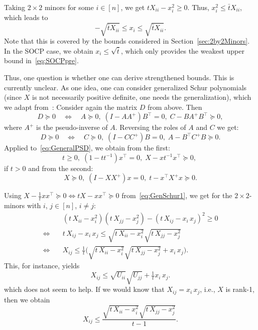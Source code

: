 \documentclass[10pt, a4paper]{article}
\newcommand{\T}{^{\top}}
\begin{document}
Taking $2 \times 2$ minors for some $i \in [n]$, we get
$t X_{ii} - x_i^2 \geq 0$. Thus, $x_i^2 \leq \bar{t} X_{ii}$, which leads
to
\[
  - \sqrt{\bar{t} X_{ii}} \leq x_i \leq \sqrt{\bar{t} X_{ii}}.
\]
Note that this is covered by the bounds considered in
Section~\ref{sec:2by2Minors}. In the SOCP case, we obtain
$x_i \leq \sqrt{\bar{t}}$, which only provides the weakest upper bound
in~\eqref{eq:SOCPpre}.

Thus, one question is whether one can derive strengthened bounds. This is
currently unclear. As one idea, one can consider generalized Schur
polynomials (since $X$ is not necessarily positive definite, one needs the
generalization), which we adapt from~\cite[Section~A.5.5]{BoyV09}: Consider
again the matrix $D$ from above. Then
\[
  D \succeq 0 \quad\Leftrightarrow\quad
  A \succeq 0,\; (I - AA^{+})B\T = 0,\; C - B A^{+} B\T \succeq 0,
\]
where $A^+$ is the pseudo-inverse of $A$. Reversing the roles of $A$ and
$C$ we get:
\[
  D \succeq 0 \quad\Leftrightarrow\quad
  C \succeq 0,\; (I - CC^{+})B = 0,\; A - B\T C^{+} B \succeq 0.
\]
Applied to~\eqref{eq:GeneralPSD}, we obtain from the first:
\begin{equation}\label{eq:GenSchur1}
  t \geq 0,\; (1 - t t^{-1}) x\T = 0,\; X - x t^{-1} x\T \succeq 0,\; 
\end{equation}
if $t > 0$ and from the second:
\begin{equation}\label{eq:GenSchur2}
  X \succeq 0,\; (I - XX^{+})x = 0,\; t - x\T X^{+} x \succeq 0.
\end{equation}

Using
$X - \tfrac{1}{t} x x\T \succeq 0 \Leftrightarrow t X - x x\T \succeq 0$
from~\eqref{eq:GenSchur1}, we get for the $2 \times 2$-minors with $i$,
$j \in [n]$, $i \neq j$:
\begin{align*}
  & (t\, X_{ii} - x_i^2) (t\, X_{jj} - x_j^2) -  (t\, X_{ij} - x_i\, x_j)^2 \geq 0
  \\
  \Leftrightarrow\quad & t \, X_{ij} - x_i\, x_j \leq \sqrt{t\, X_{ii} - x_i^2} \sqrt{t\, X_{jj} - x_j^2}
  \\
  \Leftrightarrow\quad & X_{ij} \leq \frac{1}{t} \bigg(\sqrt{t\, X_{ii} - x_i^2}
                         \sqrt{t\, X_{jj} - x_j^2} + x_i\, x_j\bigg).
\end{align*}
This, for instance, yields
\[
  X_{ij} \leq \sqrt{U_{ii}} \sqrt{U_{jj}} + \tfrac{1}{t} x_i\, x_j.
\]
which does not seem to help. If we would know that $X_{ij} = x_i\, x_j$,
i.e., $X$ is rank-1, then we obtain
\[
  X_{ij} \leq \frac{\sqrt{t\, X_{ii} - x_i^2} \sqrt{t\, X_{jj} - x_j^2}}{t-1}.
\]
\end{document}
